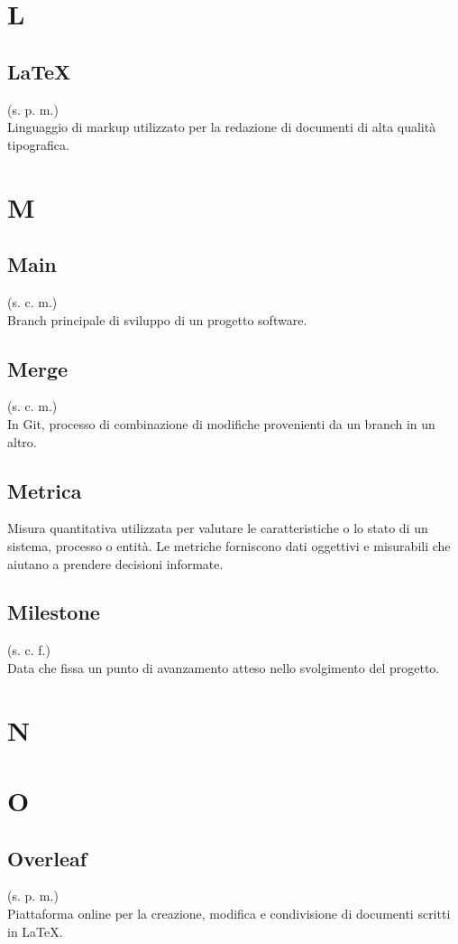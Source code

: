 \section{L}
    \subsection{LaTeX}
    \label{LaTeX}
    (s. p. m.)\\
    Linguaggio di markup utilizzato per la redazione di documenti di alta qualità tipografica.
\pagebreak
\section{M}
    \subsection{Main}
    (s. c. m.)\\
    Branch principale di sviluppo di un progetto software.
    \subsection{Merge}
    (s. c. m.)\\
    In Git, processo di combinazione di modifiche provenienti da un branch in un altro.
    \subsection{Metrica}
    Misura quantitativa utilizzata per valutare le caratteristiche o lo stato di un sistema, processo o entità. 
    Le metriche forniscono dati oggettivi e misurabili che aiutano a prendere decisioni informate.
    \subsection{Milestone}
    (s. c. f.)\\
    Data che fissa un punto di avanzamento atteso nello svolgimento del progetto.
    \pagebreak
\section{N}
\pagebreak
\section{O}
    \subsection{Overleaf}
    (s. p. m.)\\
    Piattaforma online per la creazione, modifica e condivisione di documenti 
    scritti in LaTeX.
\pagebreak
